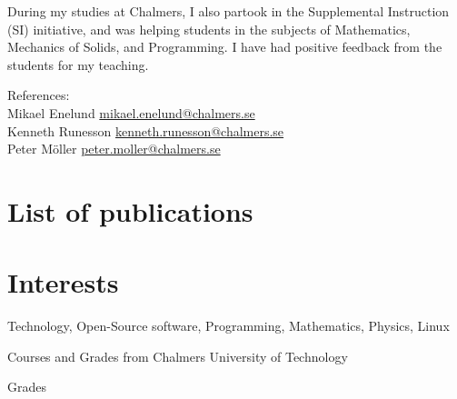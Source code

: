 \documentclass[a4paper,10pt]{article} %
\begin{document}
During my studies at Chalmers, I also partook in the Supplemental Instruction (SI) initiative, and was helping students in the subjects of Mathematics, Mechanics of Solids, and Programming.
I have had positive feedback from the students for my teaching.

References:\\
Mikael Enelund \href{mailto:mikael.enelund@chalmers.se}{mikael.enelund@chalmers.se}\\
Kenneth Runesson \href{mailto:kenneth.runesson@chalmers.se}{kenneth.runesson@chalmers.se}\\
Peter Möller \href{mailto:peter.moller@chalmers.se}{peter.moller@chalmers.se}

\section{List of publications}










\section{Interests}

Technology, Open-Source software, Programming, Mathematics, Physics, Linux\\


\newpage
\par{
\centering\Large
\hypertarget{grds}{Courses and Grades from Chalmers University of Technology}\par}
\large{\centering Grades\par}\normalsize
\end{document}
